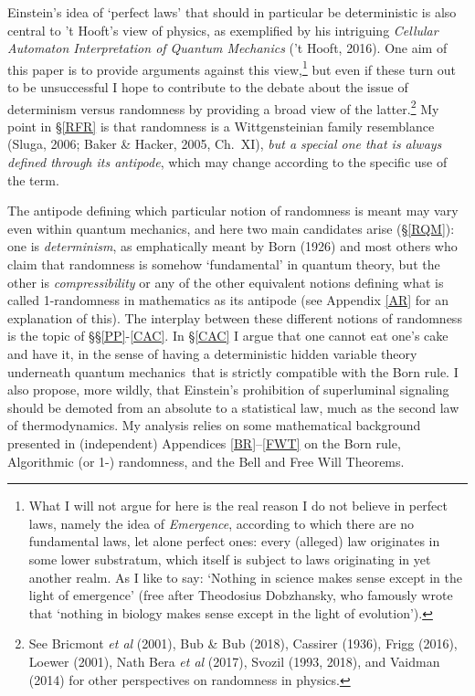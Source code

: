 \documentclass[12pt]{article}
\numberwithin{equation}{section}
\newcommand{\qm}{quantum mechanics}
\begin{document}
Einstein's idea of `perfect laws' that should in particular be deterministic is also central to 't Hooft's view of physics, as exemplified by his intriguing \emph{Cellular Automaton Interpretation of Quantum Mechanics} ('t Hooft, 2016). One aim of this paper is to provide arguments against this view,\footnote{\label{Emfn} What I will not argue for here is the real reason I do not believe in perfect laws, namely the idea of \emph{Emergence}, according to which there are no fundamental laws, let alone perfect ones: every (alleged) law originates in some lower substratum, which itself is subject to laws originating in yet another realm. As I like to say: `Nothing in science makes sense except in the light of emergence' (free after Theodosius Dobzhansky, who famously wrote that `nothing in biology makes sense except in the light of evolution').} but even if these turn out to be unsuccessful I hope to contribute to the debate about the issue of determinism versus randomness  by providing a broad view of the latter.\footnote{See Bricmont \emph{et al} (2001),
Bub \& Bub (2018), Cassirer (1936),  Frigg (2016), Loewer (2001), Nath Bera \emph{et al} (2017),  Svozil (1993, 2018), and Vaidman (2014)
for  other perspectives on randomness in physics. }
My point in \S\ref{RFR} is that randomness is a Wittgensteinian family resemblance (Sluga, 2006; Baker \& Hacker, 2005, Ch.\ XI), \emph{but a special one  that is always defined through its antipode}, which may change according to the specific use of the term. 

The antipode defining which particular notion of randomness is meant may vary even within \qm, and here two main candidates arise (\S\ref{RQM}): one is \emph{determinism}, as emphatically meant by Born (1926) and most others who claim that randomness is somehow `fundamental' in quantum theory, but the other is \emph{compressibility} or any of the other equivalent notions defining what is called 1-randomness in mathematics as its antipode (see Appendix \ref{AR} for an explanation of this). The interplay between these different notions of randomness is the topic of \S\S\ref{PP}-\ref{CAC}.
In  \S\ref{CAC} I argue that one cannot eat one's cake and have it, in the sense of having a deterministic hidden variable theory underneath \qm\ that is strictly compatible with the Born rule. I also propose, more wildly, that Einstein's prohibition of superluminal signaling should be demoted from an absolute to a statistical law, much as the second law of thermodynamics. 
My analysis  relies on some mathematical background presented  in (independent) Appendices \ref{BR}--\ref{FWT} on the Born rule, Algorithmic (or 1-) randomness, and the Bell and Free Will Theorems.
\end{document}
